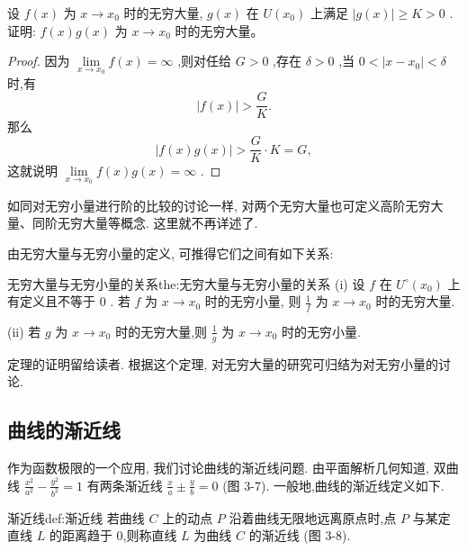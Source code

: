 \begin{example}
设 \(f\left( x\right)\) 为 \(x \rightarrow  {x}_{0}\) 时的无穷大量, \(g\left( x\right)\) 在 \(U\left( {x}_{0}\right)\) 上满足 \(\left| {g\left( x\right) }\right|  \geq  K > 0\) . 证明: \(f\left( x\right) g\left( x\right)\) 为 \(x \rightarrow  {x}_{0}\) 时的无穷大量。
\end{example}


\begin{proof}
因为 \(\mathop{\lim }\limits_{{x \rightarrow  {x}_{0}}}f\left( x\right)  = \infty\) ,则对任给 \(G > 0\) ,存在 \(\delta  > 0\) ,当 \(0 < \left| {x - {x}_{0}}\right|  < \delta\) 时,有
\[
\left| {f\left( x\right) }\right|  > \frac{G}{K}.
\]
那么
\[
\left| {f\left( x\right) g\left( x\right) }\right|  > \frac{G}{K} \cdot  K = G,
\]
这就说明 \(\mathop{\lim }\limits_{{x \rightarrow  {x}_{0}}}f\left( x\right) g\left( x\right)  = \infty\) .
\end{proof}


如同对无穷小量进行阶的比较的讨论一样, 对两个无穷大量也可定义高阶无穷大量、同阶无穷大量等概念. 这里就不再详述了.

由无穷大量与无穷小量的定义, 可推得它们之间有如下关系:

\begin{theorem}{无穷大量与无穷小量的关系}{the:无穷大量与无穷小量的关系}
(i) 设 \(f\) 在 \({U}^{ \circ  }\left( {x}_{0}\right)\) 上有定义且不等于 0 . 若 \(f\) 为 \(x \rightarrow  {x}_{0}\) 时的无穷小量, 则 \(\frac{1}{f}\) 为 \(x \rightarrow  {x}_{0}\) 时的无穷大量.

(ii) 若 \(g\) 为 \(x \rightarrow  {x}_{0}\) 时的无穷大量,则 \(\frac{1}{g}\) 为 \(x \rightarrow  {x}_{0}\) 时的无穷小量.
\end{theorem}

定理的证明留给读者. 根据这个定理, 对无穷大量的研究可归结为对无穷小量的讨论.

\subsection{曲线的渐近线}

作为函数极限的一个应用, 我们讨论曲线的渐近线问题. 由平面解析几何知道, 双曲线 \(\frac{{x}^{2}}{{a}^{2}} - \frac{{y}^{2}}{{b}^{2}} = 1\) 有两条渐近线 \(\frac{x}{a} \pm  \frac{y}{b} = 0\) (图 3-7). 一般地,曲线的渐近线定义如下.

\begin{definition}{渐近线}{def:渐近线}
若曲线 \(C\) 上的动点 \(P\) 沿着曲线无限地远离原点时,点 \(P\) 与某定直线 \(L\) 的距离趋于 0,则称直线 \(L\) 为曲线 \(C\) 的渐近线 (图 3-8).
\end{definition}


